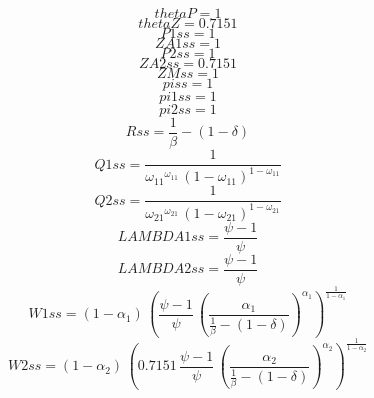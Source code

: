\begin{dmath*}
thetaP = 1
\end{dmath*}
\begin{dmath*}
thetaZ = 0.7151
\end{dmath*}
\begin{dmath*}
P1ss = 1
\end{dmath*}
\begin{dmath*}
ZA1ss = 1
\end{dmath*}
\begin{dmath*}
P2ss = 1
\end{dmath*}
\begin{dmath*}
ZA2ss = 0.7151
\end{dmath*}
\begin{dmath*}
ZMss = 1
\end{dmath*}
\begin{dmath*}
piss = 1
\end{dmath*}
\begin{dmath*}
pi1ss = 1
\end{dmath*}
\begin{dmath*}
pi2ss = 1
\end{dmath*}
\begin{dmath*}
Rss = \frac{1}{{{\beta}}}-\left(1-{{\delta}}\right)
\end{dmath*}
\begin{dmath*}
Q1ss = \frac{1}{{{\omega_{11}}}^{{{\omega_{11}}}}\, \left(1-{{\omega_{11}}}\right)^{1-{{\omega_{11}}}}}
\end{dmath*}
\begin{dmath*}
Q2ss = \frac{1}{{{\omega_{21}}}^{{{\omega_{21}}}}\, \left(1-{{\omega_{21}}}\right)^{1-{{\omega_{21}}}}}
\end{dmath*}
\begin{dmath*}
LAMBDA1ss = \frac{{{\psi}}-1}{{{\psi}}}
\end{dmath*}
\begin{dmath*}
LAMBDA2ss = \frac{{{\psi}}-1}{{{\psi}}}
\end{dmath*}
\begin{dmath*}
W1ss = \left(1-{{\alpha_{1}}}\right)\, \left(\frac{{{\psi}}-1}{{{\psi}}}\, \left(\frac{{{\alpha_{1}}}}{\frac{1}{{{\beta}}}-\left(1-{{\delta}}\right)}\right)^{{{\alpha_{1}}}}\right)^{\frac{1}{1-{{\alpha_{1}}}}}
\end{dmath*}
\begin{dmath*}
W2ss = \left(1-{{\alpha_{2}}}\right)\, \left(0.7151\, \frac{{{\psi}}-1}{{{\psi}}}\, \left(\frac{{{\alpha_{2}}}}{\frac{1}{{{\beta}}}-\left(1-{{\delta}}\right)}\right)^{{{\alpha_{2}}}}\right)^{\frac{1}{1-{{\alpha_{2}}}}}
\end{dmath*}
